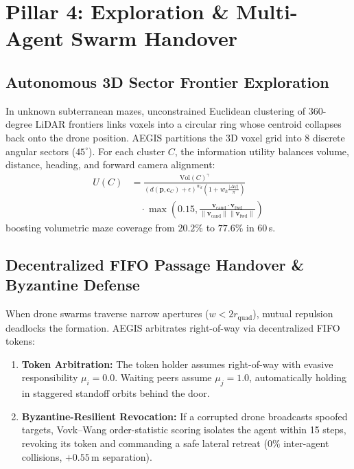 \documentclass[journal,10pt]{IEEEtran}
\begin{document}
\section{Pillar 4: Exploration \& Multi-Agent Swarm Handover}
\label{sec:pillar4_swarm}

\subsection{Autonomous 3D Sector Frontier Exploration}
In unknown subterranean mazes, unconstrained Euclidean clustering of 360-degree LiDAR frontiers links voxels into a circular ring whose centroid collapses back onto the drone position. AEGIS partitions the 3D voxel grid into 8 discrete angular sectors ($45^\circ$). For each cluster $C$, the information utility balances volume, distance, heading, and forward camera alignment:
\begin{equation}
\begin{aligned}
U(C) &= \frac{\text{Vol}(C)^{\gamma}}{(d(\mathbf{p}, \mathbf{c}_C) + \epsilon)^{w_d} \left(1 + w_h \frac{|\Delta \psi|}{\pi}\right)} \\
&\quad \cdot \max\left(0.15, \frac{\mathbf{v}_{\text{cand}} \cdot \mathbf{v}_{\text{fwd}}}{\|\mathbf{v}_{\text{cand}}\|\|\mathbf{v}_{\text{fwd}}\|}\right)
\end{aligned}
\end{equation}
boosting volumetric maze coverage from $20.2\%$ to $77.6\%$ in $60\,$s.

\subsection{Decentralized FIFO Passage Handover \& Byzantine Defense}
When drone swarms traverse narrow apertures ($w < 2 r_{\text{quad}}$), mutual repulsion deadlocks the formation. AEGIS arbitrates right-of-way via decentralized FIFO tokens:
\begin{enumerate}[leftmargin=12pt]
    \item \textbf{Token Arbitration:} The token holder assumes right-of-way with evasive responsibility $\mu_i = 0.0$. Waiting peers assume $\mu_j = 1.0$, automatically holding in staggered standoff orbits behind the door.
    \item \textbf{Byzantine-Resilient Revocation:} If a corrupted drone broadcasts spoofed targets, Vovk--Wang order-statistic scoring isolates the agent within 15 steps, revoking its token and commanding a safe lateral retreat ($0\%$ inter-agent collisions, $+0.55\,$m separation).
\end{enumerate}
\end{document}
